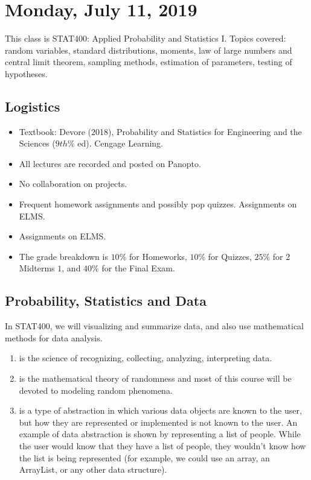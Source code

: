 \section{Monday, July 11, 2019}
This class is STAT400: Applied Probability and Statistics I. Topics covered: random variables, standard distributions, moments, law of large numbers and central limit theorem, sampling methods, estimation of parameters, testing of hypotheses.

\subsection{Logistics}
\begin{itemize}
	\item Textbook: Devore (2018), Probability and Statistics for Engineering and the Sciences ($9th\%$ ed). Cengage Learning.
    \item All lectures are recorded and posted on Panopto.
    \item No collaboration on projects.
    \item Frequent homework assignments and possibly pop quizzes. Assignments on ELMS.
    \item Assignments on ELMS. 
    \item The grade breakdown is $10\%$ for Homeworks, $10\%$ for Quizzes, $25\%$ for 2 Midterms $1$, and $40\%$ for the Final Exam. 
\end{itemize} 

\subsection{Probability, Statistics and Data}
In STAT400, we will visualizing and summarize data, and also use mathematical methods for data analysis.
\begin{enumerate}
	\item {} is the science of recognizing, collecting, analyzing, interpreting data.
    \item {} is the mathematical theory of randomness and most of this course will be devoted to modeling random phenomena. 
	\item {} is a type of abstraction in which various data objects are known to the user, but how they are represented or implemented is not known to the user. An example of data abstraction is shown by representing a list of people. While the user would know that they have a list of people, they wouldn't know how the list is being represented (for example, we could use an array, an ArrayList, or any other data structure).
\end{enumerate}

